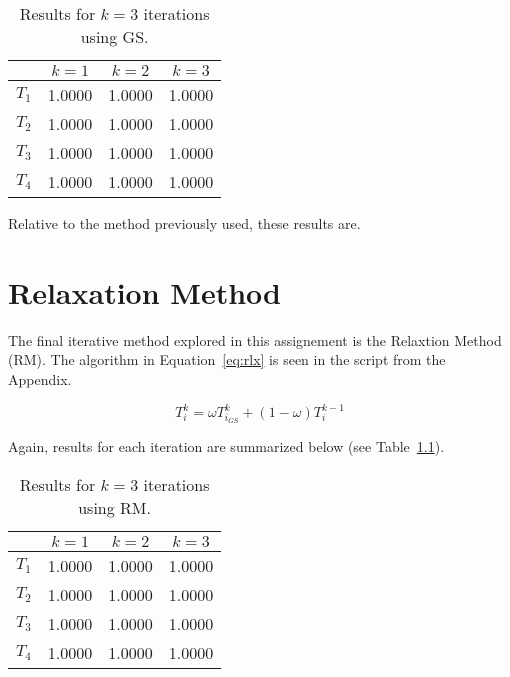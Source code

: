 \begin{table}[H]
  \centering
  \caption{Results for $k=3$ iterations using GS.}
    \begin{tabular}{cccc}
          & $k=1$ & $k=2$ & $k=3$ \\
    \midrule
    $T_1$ & 1.0000 & 1.0000 & 1.0000 \\
    $T_2$ & 1.0000 & 1.0000 & 1.0000 \\
    $T_3$ & 1.0000 & 1.0000 & 1.0000 \\
    $T_4$ & 1.0000 & 1.0000 & 1.0000 \\
    \end{tabular}
  \label{tab:gs}
\end{table}

Relative to the method previously used, these results are.

\chapter{Relaxation Method}
\label{chap:relax}


The final iterative method explored in this assignement is the Relaxtion Method (RM). The algorithm in Equation~\ref{eq:rlx} \cite{cfdbook} is seen in the script from the Appendix.

\begin{equation}
	\label{eq:rlx}	
	T_i^k = \omega T_{i_{GS}}^k +(1-\omega)T_i^{k-1}
\end{equation}

Again, results for each iteration are summarized below (see Table~\ref{tab:rm}).

\begin{table}[H]
  \centering
  \caption{Results for $k=3$ iterations using RM.}
    \begin{tabular}{cccc}
          & $k=1$ & $k=2$ & $k=3$ \\
    \midrule
    $T_1$ & 1.0000 & 1.0000 & 1.0000 \\
    $T_2$ & 1.0000 & 1.0000 & 1.0000 \\
    $T_3$ & 1.0000 & 1.0000 & 1.0000 \\
    $T_4$ & 1.0000 & 1.0000 & 1.0000 \\
    \end{tabular}
  \label{tab:rm}
\end{table}



